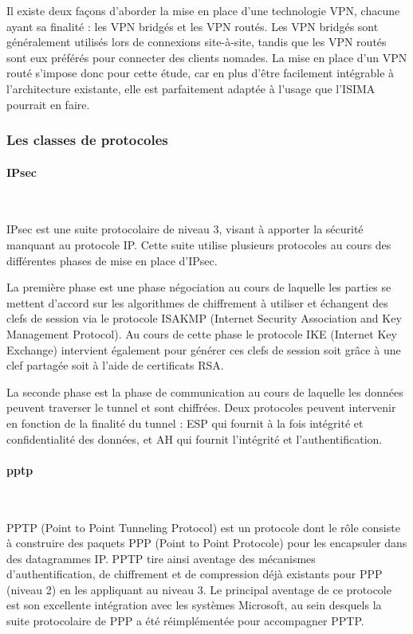 Il existe deux façons d'aborder la mise en place d'une technologie VPN, chacune ayant sa finalité : les VPN bridgés et les VPN routés. Les VPN bridgés sont généralement utilisés lors de connexions site-à-site, tandis que les VPN routés sont eux préférés pour connecter des clients nomades. La mise en place d'un VPN routé s'impose donc pour cette étude, car en plus d'être facilement intégrable à l'architecture existante, elle est parfaitement adaptée à l'usage que l'ISIMA pourrait en faire.

\subsubsection{Les classes de protocoles}
\paragraph{IPsec}
~

IPsec est une suite protocolaire de niveau 3, visant à apporter la sécurité manquant au protocole IP. Cette suite utilise plusieurs protocoles au cours des différentes phases de mise en place d'IPsec.

La première phase est une phase négociation au cours de laquelle les parties se mettent d'accord sur les algorithmes de chiffrement à utiliser et échangent des clefs de session via le protocole ISAKMP (Internet Security Association and Key Management Protocol). Au cours de cette phase le protocole IKE (Internet Key Exchange) intervient également pour générer ces clefs de session soit grâce à une clef partagée soit à l'aide de certificats RSA.

La seconde phase est la phase de communication au cours de laquelle les données peuvent traverser le tunnel et sont chiffrées. Deux protocoles peuvent intervenir en fonction de la finalité du tunnel : ESP qui fournit à la fois intégrité et confidentialité des données, et AH qui fournit l'intégrité et l'authentification.


\paragraph{pptp}
~

PPTP (Point to Point Tunneling Protocol) est un protocole dont le rôle consiste à construire des paquets PPP (Point to Point Protocole) pour les encapsuler dans des datagrammes IP. PPTP tire ainsi aventage des mécanismes d'authentification, de chiffrement et de compression déjà existants pour PPP (niveau 2) en les appliquant au niveau 3. Le principal aventage de ce protocole est son excellente intégration avec les systèmes Microsoft, au sein desquels la suite protocolaire de PPP a été réimplémentée pour accompagner PPTP.


